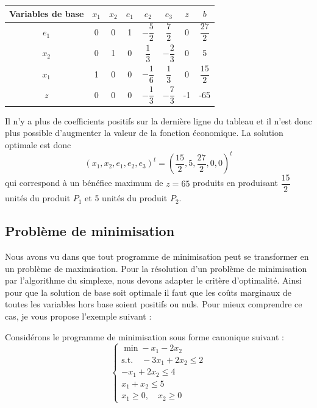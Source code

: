 \documentclass[a4paper,12pt,openany]{book}
\theoremstyle{plain}
\theoremstyle{definition}
\theoremstyle{remark}
\theoremstyle{nbstyle}
\begin{document}
	\begin{center}
		\begin{tabular}{c|ccccc|c|c}
			\toprule
			Variables de base & $x_{1}$ & $x_{2}$ & $e_{1}$ & $e_{2}$ & $e_{3}$ & $z$ & $b$ \\
			\midrule
			$e_{1}$ & 0 & 0 & 1 & $-\dfrac{5}{2}$ & $\dfrac{7}{2}$ & 0 & $\dfrac{27}{2}$ \\
			$x_{2}$ & 0 & 1 & 0 & $\dfrac{1}{3}$ & $-\dfrac{2}{3}$ & 0 & 5 \\
			$x_{1}$ & 1 & 0 & 0 & $-\dfrac{1}{6}$ & $\dfrac{1}{3}$ & 0 & $\dfrac{15}{2}$ \\
			\hline
			$z$ & 0 & 0 & 0 & $-\dfrac{1}{3}$ & $-\dfrac{7}{3}$ & -1 & -65 \\
			\bottomrule
		\end{tabular}
	\end{center}
	
	Il n'y a plus de coefficients positifs sur la dernière ligne du tableau et il n'est donc plus possible d'augmenter la valeur de la fonction économique. La solution optimale est donc
	\[
	(x_{1}, x_{2}, e_{1}, e_{2}, e_{3})^{t} = \left( \dfrac{15}{2}, 5, \dfrac{27}{2}, 0, 0 \right)^{t}
	\]
	qui correspond à un bénéfice maximum de $ z = 65 $ produits en produisant $ \dfrac{15}{2} $ unités du produit $ P_{1} $ et 5 unités du produit $ P_{2} $.
	
	\subsection{Problème de minimisation}
	
	Nous avons vu dans que tout programme de minimisation peut se transformer en un problème de maximisation.
	Pour la résolution d'un problème de minimisation par l'algorithme du simplexe, nous devons adapter le critère d'optimalité. Ainsi pour que la solution de base soit optimale il faut que les coûts marginaux de toutes les variables hors base soient positifs ou nuls.
	Pour mieux comprendre ce cas, je vous propose l'exemple suivant :
	
	Considérons le programme de minimisation sous forme canonique suivant :
	\[
	\left\{
	\begin{array}{r}
	\displaystyle\min -x_{1} - 2x_{2} \\
	\text{s.t.} \quad -3x_{1} + 2x_{2} \leq 2 \\
	-x_{1} + 2x_{2} \leq 4 \\
	x_{1} + x_{2} \leq 5 \\
	x_{1} \geq 0, \quad x_{2} \geq 0
	\end{array}
	\right.
	\]
	
\end{document}
